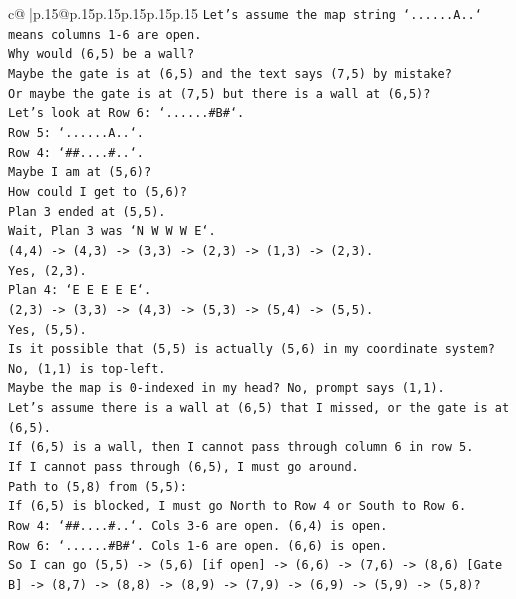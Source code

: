 \documentclass{article}
\begin{document}
{\begin{supertabular}{c@{$\;$}|p{.15\linewidth}@{}p{.15\linewidth}p{.15\linewidth}p{.15\linewidth}p{.15\linewidth}p{.15\linewidth}}
{{{\texttt{Let's assume the map string `......A..` means columns 1{-}6 are open.} \\
\texttt{Why would (6,5) be a wall?} \\
\texttt{Maybe the gate is at (6,5) and the text says (7,5) by mistake?} \\
\texttt{Or maybe the gate is at (7,5) but there is a wall at (6,5)?} \\
\texttt{Let's look at Row 6: `......\#B\#`.} \\
\texttt{Row 5: `......A..`.} \\
\texttt{Row 4: `\#\#....\#..`.} \\
\texttt{Maybe I am at (5,6)?} \\
\texttt{How could I get to (5,6)?} \\
\texttt{Plan 3 ended at (5,5).} \\
\texttt{Wait, Plan 3 was `N W W W E`.} \\
\texttt{(4,4) {-}> (4,3) {-}> (3,3) {-}> (2,3) {-}> (1,3) {-}> (2,3).} \\
\texttt{Yes, (2,3).} \\
\texttt{Plan 4: `E E E E E`.} \\
\texttt{(2,3) {-}> (3,3) {-}> (4,3) {-}> (5,3) {-}> (5,4) {-}> (5,5).} \\
\texttt{Yes, (5,5).} \\
\texttt{Is it possible that (5,5) is actually (5,6) in my coordinate system?} \\
\texttt{No, (1,1) is top{-}left.} \\
\texttt{Maybe the map is 0{-}indexed in my head? No, prompt says (1,1).} \\
\texttt{Let's assume there is a wall at (6,5) that I missed, or the gate is at (6,5).} \\
\texttt{If (6,5) is a wall, then I cannot pass through column 6 in row 5.} \\
\texttt{If I cannot pass through (6,5), I must go around.} \\
\texttt{Path to (5,8) from (5,5):} \\
\texttt{If (6,5) is blocked, I must go North to Row 4 or South to Row 6.} \\
\texttt{Row 4: `\#\#....\#..`. Cols 3{-}6 are open. (6,4) is open.} \\
\texttt{Row 6: `......\#B\#`. Cols 1{-}6 are open. (6,6) is open.} \\
\texttt{So I can go (5,5) {-}> (5,6) {[}if open{]} {-}> (6,6) {-}> (7,6) {-}> (8,6) {[}Gate B{]} {-}> (8,7) {-}> (8,8) {-}> (8,9) {-}> (7,9) {-}> (6,9) {-}> (5,9) {-}> (5,8)?} \\
}}}
\end{supertabular}}
\end{document}
